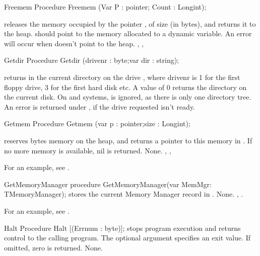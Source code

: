 
\begin{procedure}{Freemem}
\Declaration
Procedure Freemem (Var P : pointer; Count : Longint);

\Description
{} releases the memory occupied by the pointer , of size
 (in bytes), and returns it to the heap.  should point to the memory
allocated to a dynamic variable.
\Errors
An error will occur when  doesn't point to the heap.
\SeeAlso
{}, , 
\end{procedure}


\begin{procedure}{Getdir}
\Declaration
Procedure Getdir (drivenr : byte;var dir : string);

\Description
{} returns in  the current directory on the drive
, where {drivenr} is 1 for the first floppy drive, 3 for the
first hard disk etc. A value of 0 returns the directory on the current disk.
On \linux and \unix systems,  is ignored, as there is only one
directory tree.
\Errors
An error is returned under \dos, if the drive requested isn't ready.
\SeeAlso
{}
\end{procedure}


\begin{procedure}{Getmem}
\Declaration
Procedure Getmem (var p : pointer;size : Longint);

\Description
{} reserves  bytes memory on the heap, and returns a
pointer to this memory in . If no more memory is available, nil is
returned.
\Errors
None.
\SeeAlso
{}, , 
\end{procedure}
For an example, see .

\begin{procedure}{GetMemoryManager}
\Declaration
procedure GetMemoryManager(var MemMgr: TMemoryManager);
\Description
{} stores the current Memory Manager record in
.
\Errors
None.
\SeeAlso
{}, .
\end{procedure}

For an example, see \progref.

\begin{procedure}{Halt}
\Declaration
Procedure Halt [(Errnum : byte)];
\Description
{} stops program execution and returns control to the calling
program. The optional argument  specifies an exit value. If
omitted, zero is returned.
\Errors
None.
\SeeAlso
{}
\end{procedure}

